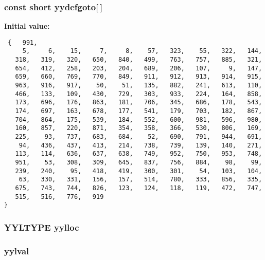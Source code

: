 \subsubsection{\setlength{\rightskip}{0pt plus 5cm}const short yydefgoto[$\,$]\hspace{0.3cm}{\tt  [static]}}\label{parser_8c_a195}


{\bf Initial value:}

\footnotesize\begin{verbatim} {   991,
     5,     6,    15,     7,     8,    57,   323,    55,   322,   144,
   318,   319,   320,   650,   840,   499,   763,   757,   885,   321,
   654,   412,   258,   203,   204,   689,   206,   107,     9,   147,
   659,   660,   769,   770,   849,   911,   912,   913,   914,   915,
   963,   916,   917,    50,    51,   135,   882,   241,   613,   110,
   466,   133,   109,   430,   729,   303,   933,   224,   164,   858,
   173,   696,   176,   863,   181,   706,   345,   686,   178,   543,
   174,   697,   163,   678,   177,   541,   179,   703,   182,   867,
   704,   864,   175,   539,   184,   552,   600,   981,   596,   980,
   160,   857,   220,   871,   354,   358,   366,   530,   806,   169,
   225,    93,   737,   683,   684,    52,   690,   791,   944,   691,
    94,   436,   437,   413,   214,   738,   739,   139,   140,   271,
   113,   114,   636,   637,   638,   749,   952,   750,   953,   748,
   951,    53,   308,   309,   645,   837,   756,   884,    98,    99,
   239,   240,    95,   418,   419,   300,   301,    54,   103,   104,
    63,   330,   331,   156,   157,   514,   780,   333,   856,   335,
   675,   743,   744,   826,   123,   124,   118,   119,   472,   747,
   515,   516,   776,   919
}\end{verbatim}\normalsize 
{}
\subsubsection{\setlength{\rightskip}{0pt plus 5cm}YYLTYPE yylloc}\label{parser_8c_a202}


\subsubsection{ yylval}\label{parser_8c_a201}


